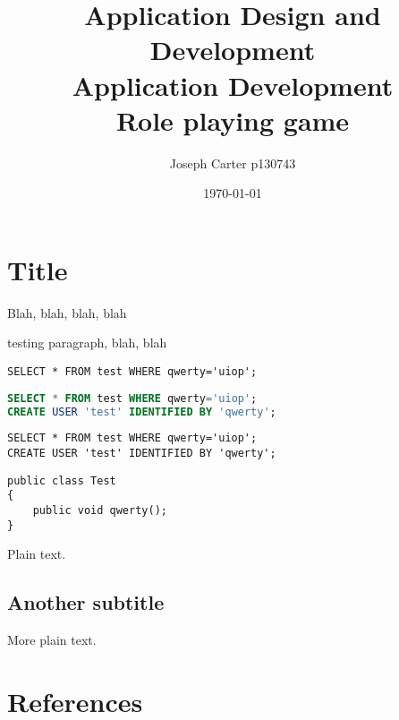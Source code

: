 \documentclass{template}
\author{Joseph Carter p130743}
\title{\textbf{Application Design and Development\\Application Development}\\ Role playing game}
\date{\today}
\begin{document}
\maketitle

\tableofcontents
\clearpage

\section{Title}
Blah, blah, blah, blah

testing paragraph, blah, blah

\begin{lstlisting}
SELECT * FROM test WHERE qwerty='uiop';
\end{lstlisting}

\begin{lstlisting}[language=sql]
SELECT * FROM test WHERE qwerty='uiop';
CREATE USER 'test' IDENTIFIED BY 'qwerty';
\end{lstlisting}

\begin{lstlisting}[language=orasql]
SELECT * FROM test WHERE qwerty='uiop';
CREATE USER 'test' IDENTIFIED BY 'qwerty';
\end{lstlisting}

\begin{lstlisting}[language={[Sharp]C}]
public class Test
{
	public void qwerty();
}
\end{lstlisting}

Plain text. \cite{debianspec}

\subsection{Another subtitle}

More plain text. \cite{profpractice}

\clearpage
\section{References}
\printbibliography
\clearpage
\end{document}
